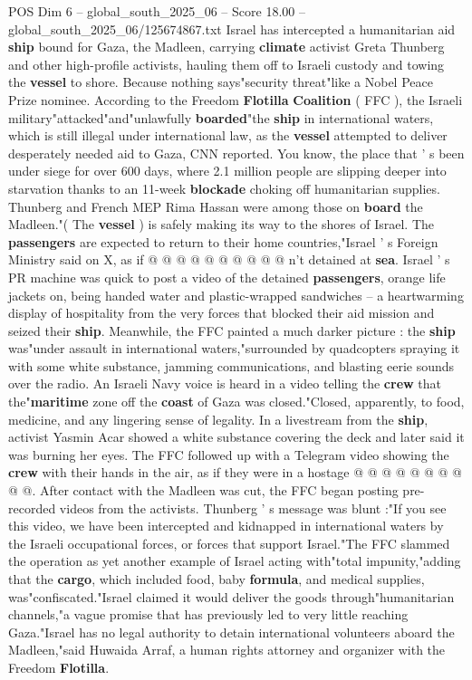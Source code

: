 \begin{textsample}{POS Dim 6 – global\_south\_2025\_06 – Score 18.00 – global\_south\_2025\_06/125674867.txt}  \label{ex:f6_pos_003}
Israel has intercepted a humanitarian aid \textbf{ship} bound for Gaza, the Madleen, carrying \textbf{climate} activist Greta Thunberg and other high-profile activists, hauling them off to Israeli custody and towing the \textbf{vessel} to shore.
Because nothing says"security threat"like a Nobel Peace Prize nominee.
According to the Freedom \textbf{Flotilla} \textbf{Coalition} ( FFC ), the Israeli military"attacked"and"unlawfully \textbf{boarded}"the \textbf{ship} in international waters, which is still illegal under international law, as the \textbf{vessel} attempted to deliver desperately needed aid to Gaza, CNN reported.
You know, the place that ' s been under siege for over 600 days, where 2.1 million people are slipping deeper into starvation thanks to an 11-week \textbf{blockade} choking off humanitarian supplies.
Thunberg and French MEP Rima Hassan were among those on \textbf{board} the Madleen."( The \textbf{vessel} ) is safely making its way to the shores of Israel.
The \textbf{passengers} are expected to return to their home countries,"Israel ' s Foreign Ministry said on X, as if @ @ @ @ @ @ @ @ @ @ n't detained at \textbf{sea}.
Israel ' s PR machine was quick to post a video of the detained \textbf{passengers}, orange life jackets on, being handed water and plastic-wrapped sandwiches -- a heartwarming display of hospitality from the very forces that blocked their aid mission and seized their \textbf{ship}.
Meanwhile, the FFC painted a much darker picture : the \textbf{ship} was"under assault in international waters,"surrounded by quadcopters spraying it with some white substance, jamming communications, and blasting eerie sounds over the radio.
An Israeli Navy voice is heard in a video telling the \textbf{crew} that the"\textbf{maritime} zone off the \textbf{coast} of Gaza was closed."Closed, apparently, to food, medicine, and any lingering sense of legality.
In a livestream from the \textbf{ship}, activist Yasmin Acar showed a white substance covering the deck and later said it was burning her eyes.
The FFC followed up with a Telegram video showing the \textbf{crew} with their hands in the air, as if they were in a hostage @ @ @ @ @ @ @ @ @ @.
After contact with the Madleen was cut, the FFC began posting pre-recorded videos from the activists.
Thunberg ' s message was blunt :"If you see this video, we have been intercepted and kidnapped in international waters by the Israeli occupational forces, or forces that support Israel."The FFC slammed the operation as yet another example of Israel acting with"total impunity,"adding that the \textbf{cargo}, which included food, baby \textbf{formula}, and medical supplies, was"confiscated."Israel claimed it would deliver the goods through"humanitarian channels,"a vague promise that has previously led to very little reaching Gaza."Israel has no legal authority to detain international volunteers aboard the Madleen,"said Huwaida Arraf, a human rights attorney and organizer with the Freedom \textbf{Flotilla}.

\end{textsample}
